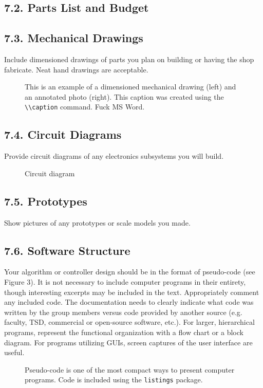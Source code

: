 \documentclass[10pt]{article}
\begin{document}
\subsection{7.2. Parts List and Budget}

\subsection{7.3. Mechanical Drawings}
Include dimensioned drawings of parts you plan on building or having the shop fabricate.   Neat hand drawings are acceptable. 
\begin{figure}
\caption{This is an example of a dimensioned mechanical drawing (left) and an annotated photo (right).  This caption was created using the \lstinline{\\caption} command. Fuck MS Word.}
\label{fig:1}
\end{figure}

\subsection{7.4. Circuit Diagrams}
Provide circuit diagrams of any electronics subsystems you will build.
\begin{figure}
\caption{Circuit diagram}
\label{fig:2}
\end{figure}

\subsection{7.5. Prototypes}
Show pictures of any prototypes or scale models you made.

\subsection{7.6. Software Structure}
Your algorithm or controller design should be in the format of pseudo-code (see Figure 3). It is not necessary to include computer programs in their entirety, though interesting excerpts may be included in the text. Appropriately comment any included code. The documentation needs to clearly indicate what code was written by the group members versus code provided by another source (e.g. faculty, TSD, commercial or open-source software, etc.).  For larger, hierarchical programs, represent the functional organization with a flow chart or a block diagram.  For programs utilizing GUIs, screen captures of the user interface are useful.   
\begin{figure}
\caption{Pseudo-code is one of the most compact ways to present computer programs. Code is included using the \texttt{listings} package.}
\label{fig:3}
\end{figure} 
\end{document}

